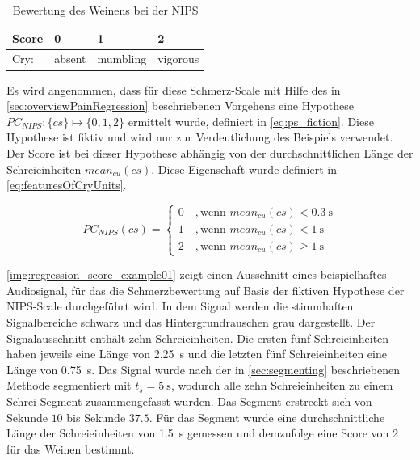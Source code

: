 \begin{table}[h]
\footnotesize
\centering
\caption[Bewertung des Weinens bei der NIPS]{Bewertung des Weinens bei der NIPS \cite{nips}}
\label{tab:fiction_scale}
\begin{tabular}{@{}llll@{}}
\toprule
Score              & 0    & 1         & 2       \\ \midrule
Cry: & absent & mumbling & vigorous \\ \bottomrule
\end{tabular}
\end{table}

Es wird angenommen, dass für diese Schmerz-Scale mit Hilfe des in \autoref{sec:overviewPainRegression} beschriebenen Vorgehens eine Hypothese $PC_{NIPS}: \{cs\} \mapsto \{0,1,2\}$ ermittelt wurde, definiert in \autoref{eq:ps_fiction}. Diese Hypothese ist fiktiv und wird nur zur Verdeutlichung des Beispiels verwendet. Der Score ist bei dieser Hypothese abhängig von der durchschnittlichen Länge der Schreieinheiten $mean_{cu}(cs)$. Diese Eigenschaft wurde definiert in \autoref{eq:featuresOfCryUnits}.

\begin{equation}
PC_{NIPS}(cs) = \begin{cases}
 0 \quad ,  \text{wenn } mean_{cu}(cs) < \SI{0.3}{\second} \\
 1 \quad ,  \text{wenn } mean_{cu}(cs) < \SI{1}{\second} \\
 2 \quad ,  \text{wenn } mean_{cu}(cs) \geq \SI{1}{\second}
 \end{cases}	
 \label{eq:ps_fiction}
\end{equation}

\autoref{img:regression_score_example01} zeigt einen Ausschnitt eines beispielhaftes Audiosignal, für das die Schmerzbewertung auf Basis der fiktiven Hypothese der NIPS-Scale durchgeführt wird. In dem Signal werden die stimmhaften Signalbereiche schwarz und das Hintergrundrauschen grau dargestellt. Der Signalausschnitt enthält zehn Schreieinheiten. Die ersten fünf Schreieinheiten haben jeweils eine Länge von \SI{2.25}{\second} und die letzten fünf Schreieinheiten eine Länge von \SI{0.75}{\second}. Das Signal wurde nach der in \autoref{sec:segmenting} beschriebenen Methode segmentiert mit $t_s = \SI{5}{\second}$, wodurch alle zehn Schreieinheiten zu einem Schrei-Segment zusammengefasst wurden. Das Segment erstreckt sich von Sekunde $10$ bis Sekunde $37.5$. Für das Segment wurde eine durchschnittliche Länge der Schreieinheiten von \SI{1.5}{\second} gemessen und demzufolge eine Score von 2 für das Weinen bestimmt.

